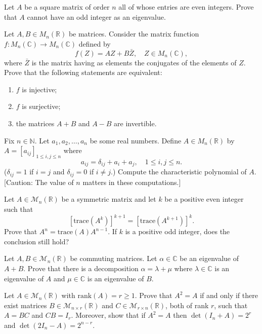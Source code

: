 \documentclass[12pt]{article}
\begin{document}
\begin{problem}
Let $A$ be a square matrix of order $n$ all of whose entries are even integers. Prove that $A$ cannot have an odd integer as an eigenvalue.
\end{problem}

\begin{problem}
Let $A,B\in M_n(\mathbb{R})$ be matrices. Consider the matrix function $f:M_n(\mathbb{C})\to M_n(\mathbb{C})$ defined by
\[
f(Z)=AZ+B\bar{Z},\quad Z\in M_n(\mathbb{C}),
\]
where $\bar{Z}$ is the matrix having as elements the conjugates of the elements of $Z$. Prove that the following statements are equivalent:
\begin{enumerate}[label=(\roman*)]
\item $f$ is injective;
\item $f$ is surjective;
\item the matrices $A+B$ and $A-B$ are invertible.
\end{enumerate}
\end{problem}

\begin{problem}
Fix $n\in\mathbb{N}$. Let $a_1,a_2,\ldots,a_n$ be some real numbers. Define $A\in M_n(\mathbb{R})$ by $A=[a_{ij}]_{1\le i,j\le n}$ where
\[
a_{ij}=\delta_{ij}+a_i+a_j,\quad 1\le i,j\le n.
\]
($\delta_{ij}=1$ if $i=j$ and $\delta_{ij}=0$ if $i\ne j$.) Compute the characteristic polynomial of $A$. [Caution: The value of $n$ matters in these computations.]
\end{problem}

\begin{problem}
Let $A \in \mathcal{M}_n(\mathbb{R})$ be a symmetric matrix and let $k$ be a positive even integer such that
\[ [\mathrm{trace}(A^k)]^{k+1} = [\mathrm{trace}(A^{k+1})]^k. \]
Prove that $A^n = \mathrm{trace}(A) A^{n-1}$. If $k$ is a positive odd integer, does the conclusion still hold?
\end{problem}

\begin{problem}
Let $A, B \in \mathcal{M}_n(\mathbb{R})$ be commuting matrices. Let $\alpha \in \mathbb{C}$ be an eigenvalue of $A+B$. Prove that there is a decomposition $\alpha = \lambda + \mu$ where $\lambda \in \mathbb{C}$ is an eigenvalue of $A$ and $\mu \in \mathbb{C}$ is an eigenvalue of $B$.
\end{problem}

\begin{problem}
Let $A \in \mathcal{M}_n(\mathbb{R})$ with $\mathrm{rank}(A) = r \geq 1$. Prove that $A^2 = A$ if and only if there exist matrices $B \in \mathcal{M}_{n\times r}(\mathbb{R})$ and $C \in \mathcal{M}_{r\times n}(\mathbb{R})$, both of rank $r$, such that $A = BC$ and $CB = I_r$. Moreover, show that if $A^2=A$ then $\det(I_n+A) = 2^r$ and $\det(2I_n - A) = 2^{n-r}$.
\end{problem}
\end{document}

